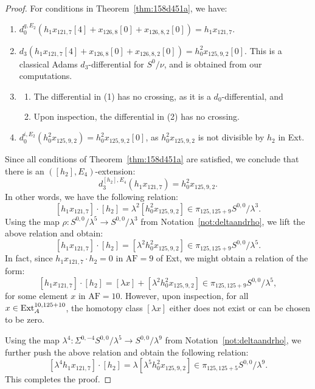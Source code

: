 \documentclass{amsart}
\numberwithin{equation}{section}
\newcommand{\AF}{\mathrm{AF}}
\begin{document}
\begin{proof}
For conditions in Theorem~\ref{thm:158d451a}, we have:
\begin{enumerate}
      \item $d_0^{q, E_2}(h_1 x_{121,7} [4] + x_{126,8}[0] + x_{126,8,2}[0]) = h_1 x_{121,7}$.
      \item $d_3 (h_1 x_{121,7} [4] + x_{126,8}[0] + x_{126,8,2}[0]) = h_0^2 x_{125,9,2} [0]$. This is a classical Adams $d_3$-differential for $S^0/\nu$, and is obtained from our computations.
      \item 
      \begin{enumerate}
          \item The differential in (1) has no crossing, as it is a $d_0$-differential, and
          \item Upon inspection, the differential in (2) has no crossing. 
      \end{enumerate}
      \item 
      $d_0^{i, E_2} (h_0^2 x_{125,9,2}) = h_0^2 x_{125,9,2}[0]$, as $h_0^2 x_{125,9,2}$ is not divisible by $h_2$ in Ext.
      \end{enumerate}
    Since all conditions of Theorem~\ref{thm:158d451a} are  satisfied, we conclude that there is an $([h_2], E_4)$-extension:
        $$d_3^{[h_2], E_4} (h_1 x_{121,7}) = h_0^2 x_{125,9,2}.$$
In other words, we have the following relation:
      $$[h_1 x_{121,7}] \cdot [h_2] = \lambda^2 [h_0^2 x_{125,9,2}] \in \pi_{125,125+9} S^{0,0}/\lambda^3.$$  
Using the map $\rho:S^{0,0}/\lambda^5 \rightarrow S^{0,0}/\lambda^3$ from Notation~\ref{not:deltaandrho}, we lift the above relation and obtain:
$$[h_1 x_{121,7}] \cdot [h_2] = [\lambda^2 h_0^2 x_{125,9,2}] \in \pi_{125,125+9} S^{0,0}/\lambda^5.$$
In fact, since $h_1 x_{121,7} \cdot h_2 = 0$ in $\AF=9$ of Ext, we might obtain a relation of the form:
$$[h_1 x_{121,7}] \cdot [h_2] = [\lambda x] + [\lambda^2 h_0^2 x_{125,9,2}] \in \pi_{125,125+9} S^{0,0}/\lambda^5,$$
for some element $x$ in $\AF=10$. However, upon inspection, for all $x \in  \mathrm{Ext}_A^{10,125+10}$, the homotopy class $[\lambda x]$ either does not exist or can be chosen to be zero.




Using the map $\lambda^4: \Sigma^{0,-4}S^{0,0}/\lambda^5 \rightarrow S^{0,0}/\lambda^9$ from Notation~\ref{not:deltaandrho}, we further push the above relation and obtain the following relation:
$$[\lambda^4 h_1 x_{121,7}] \cdot [h_2] = \lambda [\lambda^5 h_0^2 x_{125,9,2}] \in \pi_{125,125+5} S^{0,0}/\lambda^9.$$
This completes the proof.
\end{proof}
\end{document}
